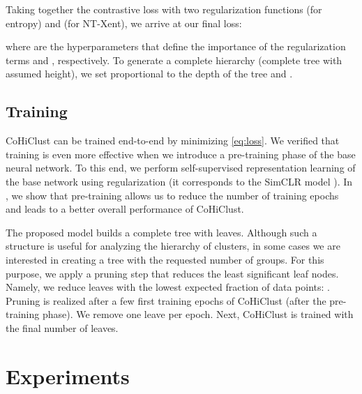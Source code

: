 \documentclass[runningheads]{llncs}
\def\our{CoHiClust}
\begin{document}
Taking together the contrastive loss  with two regularization functions  (for entropy) and  (for NT-Xent), we arrive at our final loss:

where  are the hyperparameters that define the importance of the regularization terms  and , respectively. To generate a complete hierarchy (complete tree with assumed height), we set  proportional to the depth of the tree  \cite{frosst2017distilling} and  \cite{Li2021contrastive_clustering}. 




\subsection{Training}

\our{} can be trained end-to-end by minimizing \eqref{eq:loss}. We verified that training is even more effective when we introduce a pre-training phase of the base neural network. To this end, we perform self-supervised representation learning of the base network  using  regularization (it corresponds to the SimCLR model \cite{simclr}). In , we show that pre-training allows us to reduce the number of training epochs and leads to a better overall performance of \our{}. 

The proposed model builds a complete tree with  leaves. Although such a structure is useful for analyzing the hierarchy of clusters, in some cases we are interested in creating a tree with the requested number of groups. For this purpose, we apply a pruning step that reduces the least significant leaf nodes. Namely, we reduce leaves with the lowest expected fraction of data points: . Pruning is realized after a few first training epochs of \our{} (after the pre-training phase). We remove one leave per epoch. Next, \our{} is trained with the final number of leaves.







\section{Experiments}
\end{document}
